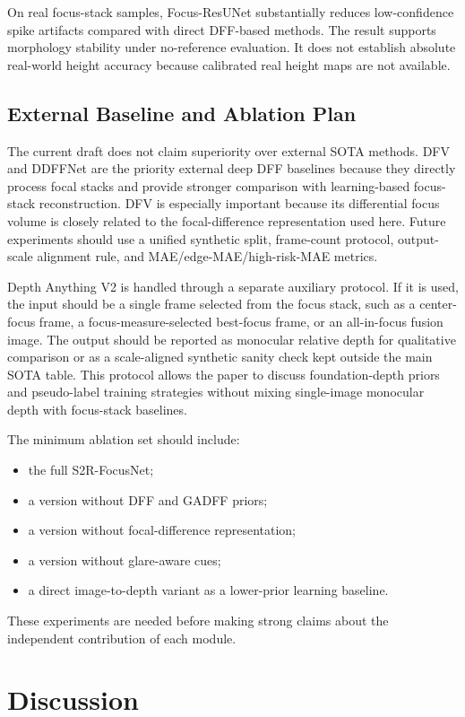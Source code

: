 \documentclass[11pt,a4paper]{article}
\newcommand{\method}{S2R-FocusNet}
\begin{document}
On real focus-stack samples, Focus-ResUNet substantially reduces low-confidence spike artifacts compared with direct DFF-based methods. The result supports morphology stability under no-reference evaluation. It does not establish absolute real-world height accuracy because calibrated real height maps are not available.

\subsection{External Baseline and Ablation Plan}

The current draft does not claim superiority over external SOTA methods. DFV and DDFFNet are the priority external deep DFF baselines because they directly process focal stacks and provide stronger comparison with learning-based focus-stack reconstruction. DFV is especially important because its differential focus volume is closely related to the focal-difference representation used here. Future experiments should use a unified synthetic split, frame-count protocol, output-scale alignment rule, and MAE/edge-MAE/high-risk-MAE metrics.

Depth Anything V2 is handled through a separate auxiliary protocol. If it is used, the input should be a single frame selected from the focus stack, such as a center-focus frame, a focus-measure-selected best-focus frame, or an all-in-focus fusion image. The output should be reported as monocular relative depth for qualitative comparison or as a scale-aligned synthetic sanity check kept outside the main SOTA table. This protocol allows the paper to discuss foundation-depth priors and pseudo-label training strategies without mixing single-image monocular depth with focus-stack baselines.

The minimum ablation set should include:
\begin{itemize}
  \item the full \method;
  \item a version without DFF and GADFF priors;
  \item a version without focal-difference representation;
  \item a version without glare-aware cues;
  \item a direct image-to-depth variant as a lower-prior learning baseline.
\end{itemize}
These experiments are needed before making strong claims about the independent contribution of each module.

\section{Discussion}
\end{document}
